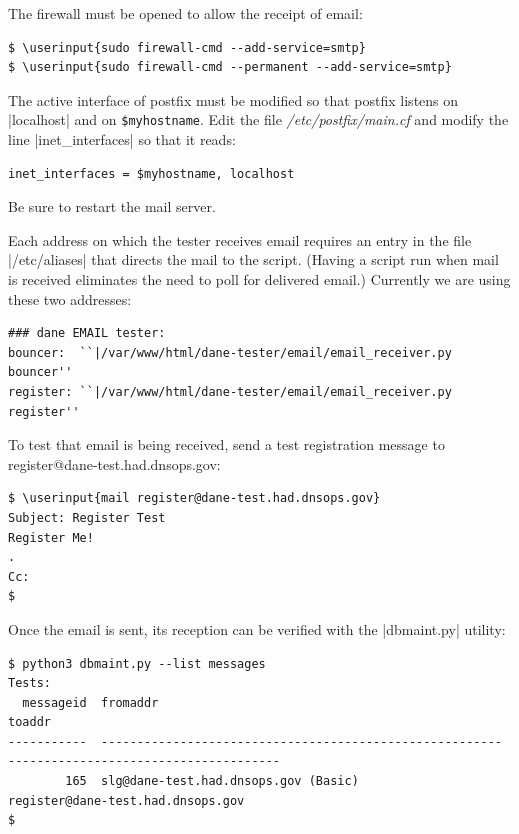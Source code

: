 \documentclass[preprint,3p]{elsarticle}
\newcommand\userinput[1]{\textbf{#1}}
\begin{document}
The firewall must be opened to allow the receipt of email:

\begin{Verbatim}[commandchars=\\\{\}]
$ \userinput{sudo firewall-cmd --add-service=smtp}
$ \userinput{sudo firewall-cmd --permanent --add-service=smtp}
\end{Verbatim}

The active interface of postfix must be modified so that postfix
listens on |localhost| and on \texttt{\$myhostname}. Edit the file
  \emph{/etc/postfix/main.cf} and modify the line |inet_interfaces| so
  that it reads:


\begin{Verbatim}[commandchars=\\\{\}]
inet_interfaces = $myhostname, localhost
\end{Verbatim}

Be sure to restart the mail server.

Each address on which the tester receives email requires an entry in
the file |/etc/aliases| that directs the mail to the script. (Having a
script run when mail is received eliminates the need to poll for
delivered email.)  Currently we are using these two addresses:

\begin{Verbatim}[commandchars=\\\{\}]
### dane EMAIL tester:
bouncer:  ``|/var/www/html/dane-tester/email/email_receiver.py bouncer''
register: ``|/var/www/html/dane-tester/email/email_receiver.py register''
\end{Verbatim}

To test that email is being received, send a test registration message
to register@dane-test.had.dnsops.gov:

\begin{Verbatim}[commandchars=\\\{\}]
$ \userinput{mail register@dane-test.had.dnsops.gov}
Subject: Register Test
Register Me!
.
Cc:
$
\end{Verbatim}

Once the email is sent, its reception can be verified with the
|dbmaint.py| utility:

\begin{Verbatim}[commandchars=\\\{\}]
$ python3 dbmaint.py --list messages
Tests:
  messageid  fromaddr                                                  toaddr                                    
-----------  --------------------------------------------------------  --------------------------------------
        165  slg@dane-test.had.dnsops.gov (Basic)                      register@dane-test.had.dnsops.gov         
$
\end{Verbatim}
\end{document}
